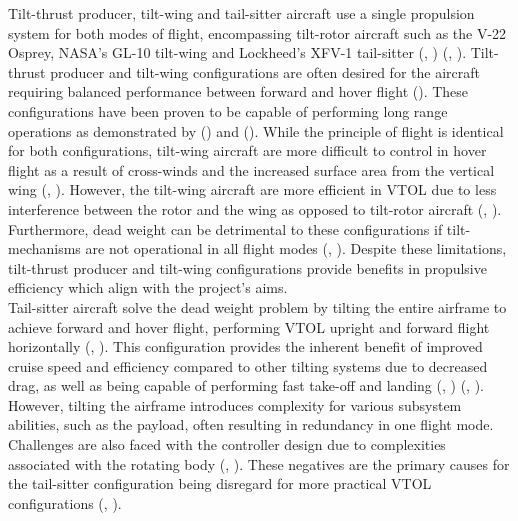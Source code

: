 Tilt-thrust producer, tilt-wing and tail-sitter aircraft use a single propulsion system for both modes of flight, encompassing tilt-rotor aircraft such as the V-22 Osprey, NASA’s GL-10 tilt-wing and Lockheed’s XFV-1 tail-sitter (\citeauthor{hirschberg2006overview}, \citeyear{hirschberg2006overview}) (\citeauthor{rothhaar2014nasa}, \citeyear{rothhaar2014nasa}). Tilt-thrust producer and tilt-wing configurations are often desired for the aircraft requiring balanced performance between forward and hover flight \citeauthor{RN15} (\citeyear{RN15}). These configurations have been proven to be capable of performing long range operations as demonstrated by \citeauthor{rothhaar2014nasa} (\citeyear{rothhaar2014nasa}) and \citeauthor{Bellv280} (\citeyear{Bellv280}). While the principle of flight is identical for both configurations, tilt-wing aircraft are more difficult to control in hover flight as a result of cross-winds and the increased surface area from the vertical wing (\citeauthor{hirschberg2006overview}, \citeyear{hirschberg2006overview}). However, the tilt-wing aircraft are more efficient in VTOL due to less interference between the rotor and the wing as opposed to tilt-rotor aircraft (\citeauthor{paduano2017system}, \citeyear{paduano2017system}). Furthermore, dead weight can be detrimental to these configurations if tilt-mechanisms are not operational in all flight modes (\citeauthor{RN15}, \citeyear{RN15}). Despite these limitations, tilt-thrust producer and tilt-wing configurations provide benefits in propulsive efficiency which align with the project’s aims. \\

Tail-sitter aircraft solve the dead weight problem by tilting the entire airframe to achieve forward and hover flight, performing VTOL upright and forward flight horizontally (\citeauthor{hirschberg2006overview}, \citeyear{hirschberg2006overview}). This configuration provides the inherent benefit of improved cruise speed and efficiency compared to other tilting systems due to decreased drag, as well as being capable of performing fast take-off and landing (\citeauthor{hirschberg2006overview}, \citeyear{hirschberg2006overview}) (\citeauthor{RN15}, \citeyear{RN15}). However, tilting the airframe introduces complexity for various subsystem abilities, such as the payload, often resulting in redundancy in one flight mode. Challenges are also faced with the controller design due to complexities associated with the rotating body (\citeauthor{hochstenbach2015design}, \citeyear{hochstenbach2015design}). These negatives are the primary causes for the tail-sitter configuration being disregard for more practical VTOL configurations (\citeauthor{RN15}, \citeyear{RN15}). \\

